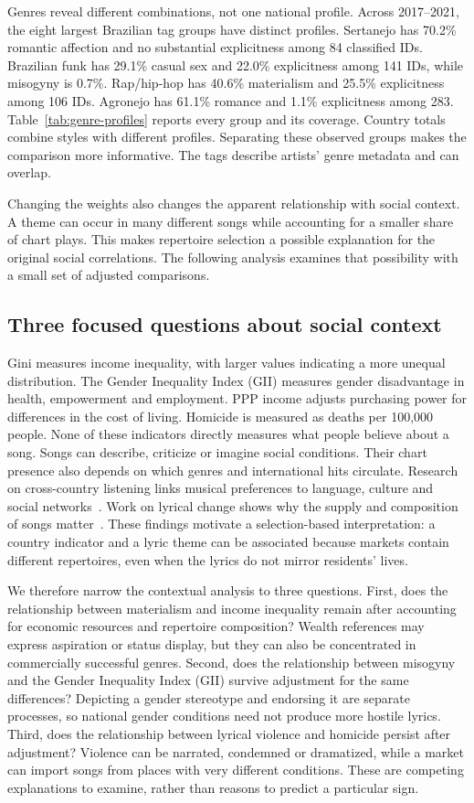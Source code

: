 \documentclass[10pt,a4paper,twocolumn]{article}
\begin{document}
Genres reveal different combinations, not one national profile. Across 2017--2021, the eight largest Brazilian tag groups have distinct profiles. Sertanejo has 70.2\% romantic affection and no substantial explicitness among 84 classified IDs. Brazilian funk has 29.1\% casual sex and 22.0\% explicitness among 141 IDs, while misogyny is 0.7\%. Rap/hip-hop has 40.6\% materialism and 25.5\% explicitness among 106 IDs. Agronejo has 61.1\% romance and 1.1\% explicitness among 283. Table~\ref{tab:genre-profiles} reports every group and its coverage. Country totals combine styles with different profiles. Separating these observed groups makes the comparison more informative. The tags describe artists' genre metadata and can overlap.

Changing the weights also changes the apparent relationship with social context. A theme can occur in many different songs while accounting for a smaller share of chart plays. This makes repertoire selection a possible explanation for the original social correlations. The following analysis examines that possibility with a small set of adjusted comparisons.

\subsection{Three focused questions about social context}
Gini measures income inequality, with larger values indicating a more unequal distribution. The Gender Inequality Index (GII) measures gender disadvantage in health, empowerment and employment. PPP income adjusts purchasing power for differences in the cost of living. Homicide is measured as deaths per 100,000 people. None of these indicators directly measures what people believe about a song.
Songs can describe, criticize or imagine social conditions. Their chart presence also depends on which genres and international hits circulate. Research on cross-country listening links musical preferences to language, culture and social networks~\cite{liu}. Work on lyrical change shows why the supply and composition of songs matter~\cite{varnum,parada}. These findings motivate a selection-based interpretation: a country indicator and a lyric theme can be associated because markets contain different repertoires, even when the lyrics do not mirror residents' lives.

We therefore narrow the contextual analysis to three questions. First, does the relationship between materialism and income inequality remain after accounting for economic resources and repertoire composition? Wealth references may express aspiration or status display, but they can also be concentrated in commercially successful genres. Second, does the relationship between misogyny and the Gender Inequality Index (GII) survive adjustment for the same differences? Depicting a gender stereotype and endorsing it are separate processes, so national gender conditions need not produce more hostile lyrics. Third, does the relationship between lyrical violence and homicide persist after adjustment? Violence can be narrated, condemned or dramatized, while a market can import songs from places with very different conditions. These are competing explanations to examine, rather than reasons to predict a particular sign.
\end{document}
